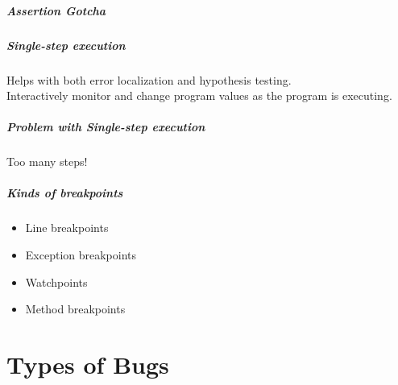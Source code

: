\begin{frame}
\frametitle{Assertion Gotcha}

\Large
\begin{center}
\end{center}

\end{frame}

\begin{frame}
\frametitle{Single-step execution}

\begin{changemargin}{1cm}
\Large
Helps with both error localization and hypothesis testing.\\[1em]

Interactively monitor and change program values as the
program is executing.
\end{changemargin}

\end{frame}

\begin{frame}
\frametitle{Problem with Single-step execution}

\begin{changemargin}{1cm}
\Large
Too many steps!\\[1em]


\end{changemargin}

\end{frame}

\begin{frame}
\frametitle{Kinds of breakpoints}

\begin{changemargin}{1cm}

\Large
\begin{itemize}
\item Line breakpoints
\item Exception breakpoints
\item Watchpoints
\item Method breakpoints
\end{itemize}

\end{changemargin}

\end{frame}

\part{Types of Bugs}
\frame{\partpage}


